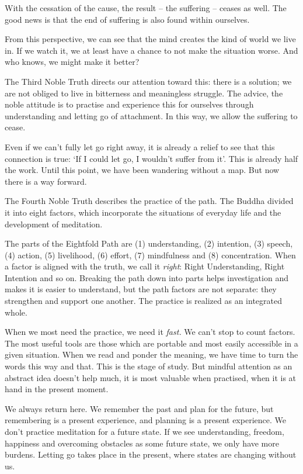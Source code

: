 
With the cessation of the cause, the result -- the suffering -- ceases
as well. The good news is that the end of suffering is also found within
ourselves.

From this perspective, we can see that the mind creates the kind of
world we live in. If we watch it, we at least have a chance to not make
the situation worse. And who knows, we might make it better?

The Third Noble Truth directs our attention toward this: there is a
solution; we are not obliged to live in bitterness and meaningless
struggle. The advice, the noble attitude is to practise and experience
this for ourselves through understanding and letting go of attachment.
In this way, we allow the suffering to cease.

Even if we can't fully let go right away, it is already a relief to see
that this connection is true: `If I could let go, I wouldn't suffer from
it'. This is already half the work. Until this point, we have been
wandering without a map. But now there is a way forward.


\enlargethispage*{\baselineskip}

The Fourth Noble Truth describes the practice of the path. The Buddha
divided it into eight factors, which incorporate the situations of
everyday life and the development of meditation.

The parts of the Eightfold Path are (1) understanding, (2) intention,
(3) speech, (4) action, (5) livelihood, (6) effort, (7) mindfulness and
(8) concentration. When a factor is aligned with the truth, we call it
\emph{right}: Right Understanding, Right Intention and so on. Breaking
the path down into parts helps investigation and makes it is easier to
understand, but the path factors are not separate: they strengthen and
support one another. The practice is realized as an integrated whole.

When we most need the practice, we need it \emph{fast.} We can't stop to
count factors. The most useful tools are those which are portable and
most easily accessible in a given situation. When we read and ponder the
meaning, we have time to turn the words this way and that. This is the
stage of study. But mindful attention as an abstract idea doesn't help
much, it is most valuable when practised, when it is at hand in the
present moment.

We always return here. We remember the past and plan for the future, but
remembering is a present experience, and planning is a present
experience. We don't practice meditation for a future state. If we see
understanding, freedom, happiness and overcoming obstacles as some
future state, we only have more burdens. Letting go takes place in the
present, where states are changing without us.
